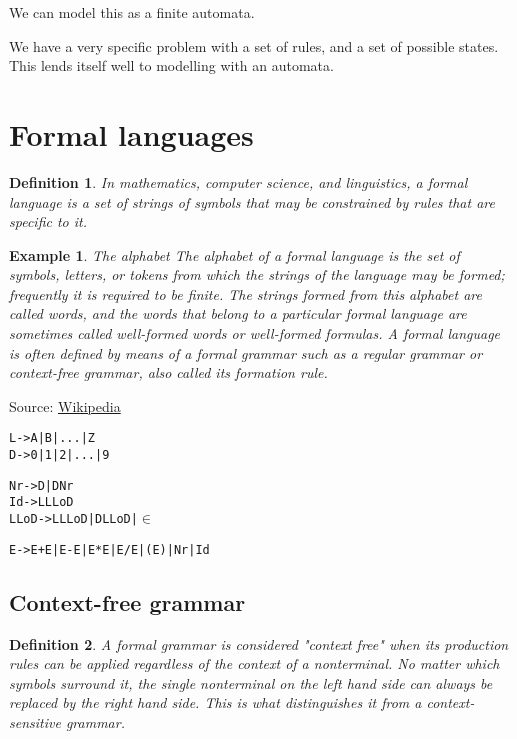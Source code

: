 \documentclass{article}
\newtheorem{definition}{Definition}[section]
\newtheorem{example}{Example}[section]
\begin{document}
We can model this as a finite automata.

We have a very specific problem with a set of rules, and a set of possible states. This lends itself well to modelling with an automata.

\section{Formal languages}

\begin{definition}
    In mathematics, computer science, and linguistics, a formal language is a set of strings of symbols that may be constrained by rules that are specific to it.
\end{definition}

\begin{example}{The alphabet}
    The alphabet of a formal language is the set of symbols, letters, or tokens from which the strings of the language may be formed; frequently it is required to be finite. The strings formed from this alphabet are called words, and the words that belong to a particular formal language are sometimes called well-formed words or well-formed formulas. A formal language is often defined by means of a formal grammar such as a regular grammar or context-free grammar, also called its formation rule.
\end{example}

Source: \href{https://en.wikipedia.org/wiki/Formal_language}{Wikipedia}

\begin{alltt}
    L -> A | B | ... | Z
    D -> 0 | 1 | 2 | ... | 9

    Nr -> D | D Nr
    Id -> L LLoD
    LLoD -> L LLoD | D LLoD | \( \in \)

    E -> E + E | E - E | E * E | E / E | (E) | Nr | Id
\end{alltt}

\subsection{Context-free grammar}

\begin{definition}
    A formal grammar is considered "context free" when its production rules can be applied regardless of the context of a nonterminal. No matter which symbols surround it, the single nonterminal on the left hand side can always be replaced by the right hand side. This is what distinguishes it from a context-sensitive grammar.
\end{definition}
\end{document}

